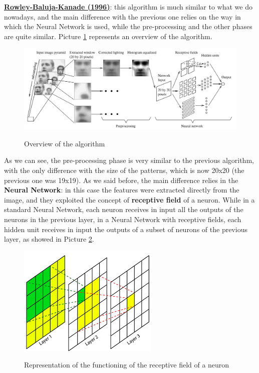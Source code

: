 \underline{\textbf{Rowley-Baluja-Kanade (1996)}}: this algorithm is much similar to what we do nowadays, and the main difference with the previous one relies on the way in which the Neural Network is used, while the pre-processing and the other phases are quite similar. Picture \ref{rowley_overview} represents an overview of the algorithm.

\begin{figure}[h!]
		\centering
		\includegraphics[scale = 0.7]{img/rowley_overview.jpg}
        \label{rowley_overview}
        \caption{Overview of the algorithm}
\end{figure}

As we can see, the pre-processing phase is very similar to the previous algorithm, with the only difference with the size of the patterns, which is now 20x20 (the previous one was 19x19). As we said before, the main difference relies in the \textbf{Neural Network}: in this case the features were extracted directly from the image, and they exploited the concept of \textbf{receptive field} of a neuron. While in a standard Neural Network, each neuron receives in input all the outputs of the neurons in the previous layer, in a Neural Network with receptive fields, each hidden unit receives in input the outputs of a subset of neurons of the previous layer, as showed in Picture \ref{receptive}. 

\begin{figure}[h!]
		\centering
		\includegraphics[scale = 0.5]{img/receptive_field.png}
        \label{receptive}
        \caption{Representation of the functioning of the receptive field of a neuron}
\end{figure}

